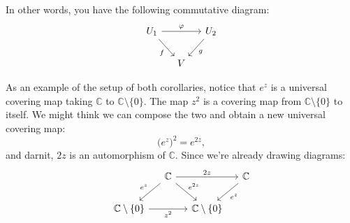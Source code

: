 \documentclass[12pt,openany]{book}
\newcommand{\C}{{\mathbb{C}}}
\theoremstyle{plain}
\theoremstyle{remark}
\theoremstyle{definition}
\theoremstyle{exercise}
\theoremstyle{example}
\begin{document}
In other words, you have the following commutative diagram:
\begin{equation*}
\begin{tikzcd}[column sep=small]
U_1 \arrow[rr,"\varphi"] \arrow[dr,"f"'] & & U_2 \arrow[dl,"g"] \\
                               & V
\end{tikzcd}
\end{equation*}

As an example of the setup of both corollaries,
notice that $e^z$ is a universal covering map taking $\C$ to $\C \setminus \{ 0 \}$.
The map $z^2$ is a covering map from $\C \setminus \{ 0 \}$ to itself.
We might think we can compose the two and obtain a new universal covering map:
\begin{equation*}
{\bigl(e^z\bigr)}^2 = e^{2z} ,
\end{equation*}
and darnit, $2z$ is an automorphism of $\C$.  Since we're already drawing
diagrams:
\begin{equation*}
\begin{tikzcd}[column sep=small]
& \C \arrow[dl,"e^z"'] \arrow[dr,"e^{2z}"] \arrow[rr,"2z"] & & \C \arrow[dl,"e^z"] \\
\C \setminus \{ 0 \} \arrow[rr,"z^2"'] & & \C \setminus \{ 0 \} 
\end{tikzcd}
\end{equation*}
\end{document}
